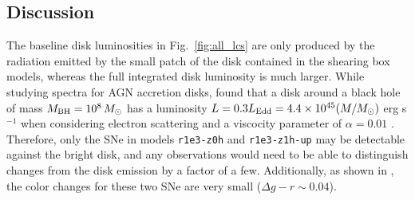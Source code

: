 




\subsection{Discussion} \label{sec:discussion}

The baseline disk luminosities in Fig.~\ref{fig:all_lcs} are only produced by the radiation emitted by the small patch of the disk contained in the shearing box models, whereas the full integrated disk luminosity is much larger.
While studying spectra for AGN accretion disks, \citet{Hubeny+01} found that a disk around a black hole of mass $M_{\rm BH}=10^8\,M_{\odot}$ has a luminosity $L=0.3L_\text{Edd}=4.4\times10^{45}(M/M_{\odot})$ erg s$^{-1}$ when considering electron scattering and a viscocity parameter of $\alpha=0.01$ .
Therefore, only the SNe in models \texttt{r1e3-z0h} and \texttt{r1e3-z1h-up} may be detectable against the bright disk, and any observations would need to be able to distinguish changes from the disk emission by a factor of a few.
Additionally, as shown in , the color changes for these two SNe are very small ($\Delta g-r \sim 0.04$).



